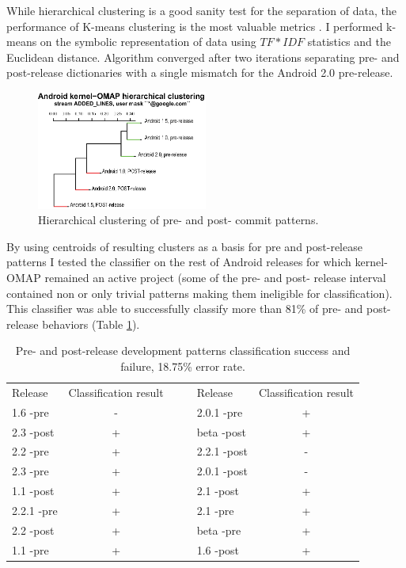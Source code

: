 \documentclass[10pt, conference, compsocconf]{IEEEtran}
\begin{document}
While hierarchical clustering is a good sanity test for the separation of data, the performance of K-means 
clustering is the most valuable metrics \cite{citeulike:3562}. I performed k-means on the symbolic 
representation of data using $TF\ast IDF$ statistics and the Euclidean distance. Algorithm converged after two
iterations separating pre- and post-release dictionaries with a single mismatch for the Android 2.0 pre-release.

\begin{figure}[htb]
  \centering
  \includegraphics[width=0.5\textwidth]{figures/omap-hclust.eps}
  \caption{Hierarchical clustering of pre- and post- commit patterns.}
  \label{fig:kernel_cluster}
\end{figure}

By using centroids of resulting clusters as a basis for pre and post-release patterns I tested 
the classifier on the rest of Android releases for which kernel-OMAP remained an active project
(some of the pre- and post- release interval contained non or only trivial patterns making them
ineligible for classification). This classifier was able to successfully classify more than 81\% 
of pre- and post-release behaviors (Table \ref{tab:success}).

\begin{table}
  \caption{Pre- and post-release development patterns classification success and failure, 18.75\% error rate.}
  \tiny
  \label{tab:success}
  \begin{tabular}{ | l | c | c c | l | c |}
  \cline{1-2} \cline{5-6}
  Release & Classification result& & & Release & Classification result\\
  \cline{1-2} \cline{5-6}
1.6 -pre & - & & & 2.0.1 -pre & + \\ 
2.3 -post & + & & & beta -post & + \\
2.2 -pre & + & & & 2.2.1 -post & - \\
2.3 -pre & + & & & 2.0.1 -post & -\\
1.1 -post & + & & & 2.1 -post & + \\
2.2.1 -pre & + & & & 2.1 -pre & + \\
2.2 -post & + & & & beta -pre & + \\
1.1 -pre & + & & & 1.6 -post & + \\
  \cline{1-2} \cline{5-6}
  \end{tabular}
\end{table}
\end{document}
